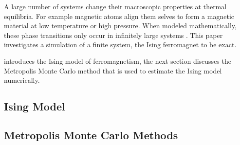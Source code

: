 A large number of systems change their macroscopic properties at thermal equilibria. For example magnetic atoms align them selves to form a magnetic material at low temperature or high pressure. When modeled mathematically, these phase transitions only occur in infinitely large systems \cite{kenzel1997physics}. This paper investigates a simulation of a finite system, the Ising ferromagnet to be exact.

 introduces the Ising model of ferromagnetism, the next section discusses the Metropolis Monte Carlo method that is used to estimate the Ising model numerically.

\subsection{Ising Model}
	\label{ss:intro:ising}
	

\subsection{Metropolis Monte Carlo Methods}
	\label{ss:intro:mmc}
	

